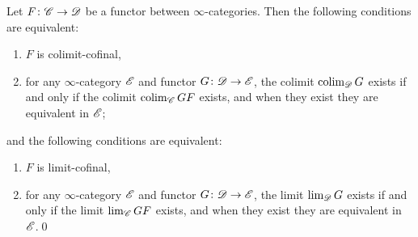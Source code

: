 \documentclass[../../thesis.tex]{subfiles}
\begin{document}
\begin{corollary}
    Let $F \colon \mathscr{C} \to \mathscr{D}$ be a functor between $\infty$-categories.
    Then the following conditions are equivalent:
    \begin{enumerate}
        \item $F$ is colimit-cofinal,
        \item for any $\infty$-category $\mathscr{E}$ and functor $G\colon\mathscr{D}\to\mathscr{E}$, the colimit $\operatorname{colim}_{\mathscr{D}}G$ exists if and only if the colimit $\operatorname{colim}_{\mathscr{C}}GF$ exists, and when they exist they are equivalent in $\mathscr{E}$;
    \end{enumerate}
    and the following conditions are equivalent:
    \begin{enumerate}
        \item $F$ is limit-cofinal,
        \item for any $\infty$-category $\mathscr{E}$ and functor $G\colon\mathscr{D}\to\mathscr{E}$, the limit $\lim_{\mathscr{D}}G$ exists if and only if the limit $\lim_{\mathscr{C}}GF$ exists, and when they exist they are equivalent in $\mathscr{E}$.\qed
    \end{enumerate}
\end{corollary}
\end{document}
